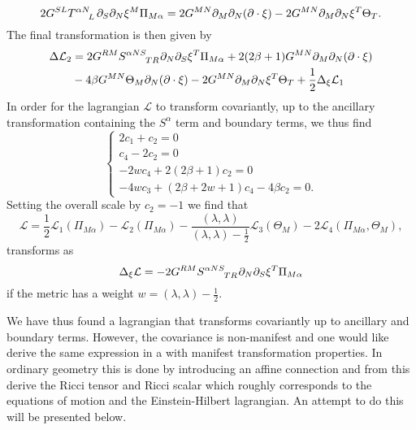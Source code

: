 \begin{equation}
    2G^{SL}\tensor{T}{^{\alpha N}_L}\pd_S\pd_N\xi^M\Pi_{M\alpha} = 2G^{MN}\pd_M\pd_N(\pd\cdot\xi)-2G^{MN}\pd_M\pd_N\xi^T\Theta_T.
\end{equation}
The final transformation is then given by
\begin{equation}
    \begin{aligned}
    \Delta \mathcal{L}_2 &= 2G^{RM}\tensor{S}{^{\alpha NS}_{TR}}\pd_N\pd_S\xi^T\Pi_{M\alpha}+2(2\beta+1)G^{MN}\pd_M\pd_N(\pd\cdot\xi)\\
    &-4\beta G^{MN}\Theta_M\pd_N(\pd\cdot\xi)-2G^{MN}\pd_M\pd_N\xi^T\Theta_T+\frac{1}{2}\Delta_\xi \mathcal{L}_1
    \end{aligned}
\end{equation}
In order for the lagrangian $\mathcal{L}$ to transform covariantly, up to the ancillary transformation containing the $S^\alpha$ term and boundary terms, we thus find 
\begin{equation}
    \begin{cases}
        2c_1+c_2 = 0\\
        c_4-2c_2 = 0\\
        -2wc_4+2(2\beta+1)c_2 = 0\\
        -4wc_3+(2\beta+2w+1)c_4-4\beta c_2 = 0.
    \end{cases}
\end{equation}
Setting the overall scale by $c_2=-1$ we find that 
\begin{equation}\label{eq:Lagrangian}
    \mathcal{L} = \frac{1}{2}\mathcal{L}_1(\Pi_{M\alpha})-\mathcal{L}_2(\Pi_{M\alpha})-\frac{(\lambda,\lambda)}{(\lambda,\lambda)-\frac{1}{2}}\mathcal{L}_3(\Theta_M)-2\mathcal{L}_4(\Pi_{M\alpha},\Theta_M),
\end{equation}
transforms as 
\begin{equation}
    \Delta_\xi \mathcal{L} = -2G^{RM}\tensor{S}{^{\alpha NS}_{TR}}\pd_N\pd_S\xi^T\Pi_{M\alpha}
\end{equation}
if the metric has a weight $w=(\lambda,\lambda)-\frac{1}{2}$. 

We have thus found a lagrangian that transforms covariantly up to ancillary and boundary terms. However, the covariance is non-manifest and one would like derive the same expression in a with manifest transformation properties. In ordinary geometry this is done by introducing an affine connection and from this derive the Ricci tensor and Ricci scalar which roughly corresponds to the equations of motion and the Einstein-Hilbert lagrangian. An attempt to do this will be presented below. 

